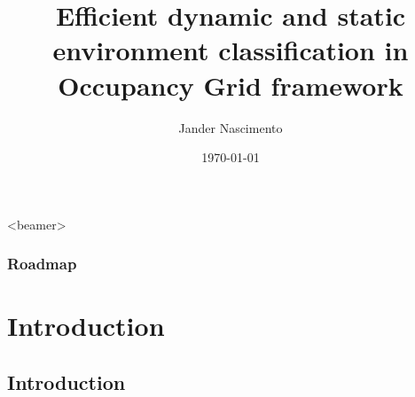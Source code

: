 \documentclass{beamer}
\title[Fast classification]{Efficient dynamic and static environment classification in Occupancy Grid framework}
\author{Jander Nascimento}
\institute{Université Joseph Fourier \\ e-motion (Inria/LIG)}
\date{\today}
\begin{document}
\begin{frame}
\titlepage
\end{frame}


\newcommand{\backupbegin}{
   \newcounter{framenumberappendix}
   \setcounter{framenumberappendix}{\value{framenumber}}
}
\newcommand{\backupend}{
   \addtocounter{framenumberappendix}{-\value{framenumber}}
   \addtocounter{framenumber}{\value{framenumberappendix}} 
}

{
  \begin{frame}<beamer>
    \frametitle{Roadmap}
    \tableofcontents%
  \end{frame}
}

	\section{Introduction}
	
\subsection*{Introduction}	
\end{document}
